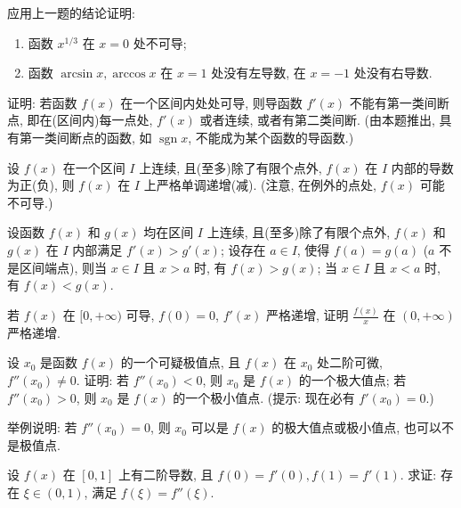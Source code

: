 \begin{exercise}[3.3.14]
    应用上一题的结论证明:
    \begin{enumerate}
        \item 函数 $x^{1/3}$ 在 $x=0$ 处不可导;
        \item 函数 $\arcsin x, \arccos x$ 在 $x=1$ 处没有左导数, 在 $x=-1$ 处没有右导数.
    \end{enumerate}
\end{exercise}

\begin{exercise}[3.3.15]
    证明: 若函数 $f(x)$ 在一个区间内处处可导, 则导函数 $f'(x)$ 不能有第一类间断点, 即在(区间内)每一点处, $f'(x)$ 或者连续, 或者有第二类间断. (由本题推出, 具有第一类间断点的函数, 如 $\operatorname{sgn} x$, 不能成为某个函数的导函数.)
\end{exercise}

\begin{exercise}[3.3.16]
    设 $f(x)$ 在一个区间 $I$ 上连续, 且(至多)除了有限个点外, $f(x)$ 在 $I$ 内部的导数为正(负), 则 $f(x)$ 在 $I$ 上严格单调递增(减). (注意, 在例外的点处, $f(x)$ 可能不可导.)
\end{exercise}

\begin{exercise}[3.3.17]
    设函数 $f(x)$ 和 $g(x)$ 均在区间 $I$ 上连续, 且(至多)除了有限个点外, $f(x)$ 和 $g(x)$ 在 $I$ 内部满足 $f'(x) > g'(x)$; 设存在 $a \in I$, 使得 $f(a)=g(a)$ ($a$ 不是区间端点), 则当 $x \in I$ 且 $x>a$ 时, 有 $f(x)>g(x)$; 当 $x \in I$ 且 $x<a$ 时, 有 $f(x)<g(x)$.
\end{exercise}

\begin{exercise}[3.3.18]
    若 $f(x)$ 在 $[0, +\infty)$ 可导, $f(0)=0$, $f'(x)$ 严格递增, 证明 $\frac{f(x)}{x}$ 在 $(0, +\infty)$ 严格递增.
\end{exercise}

\begin{exercise}[3.3.19]
    设 $x_0$ 是函数 $f(x)$ 的一个可疑极值点, 且 $f(x)$ 在 $x_0$ 处二阶可微, $f''(x_0) \ne 0$. 证明: 若 $f''(x_0)<0$, 则 $x_0$ 是 $f(x)$ 的一个极大值点; 若 $f''(x_0)>0$, 则 $x_0$ 是 $f(x)$ 的一个极小值点. (提示: 现在必有 $f'(x_0)=0$.)

    举例说明: 若 $f''(x_0)=0$, 则 $x_0$ 可以是 $f(x)$ 的极大值点或极小值点, 也可以不是极值点.
\end{exercise}

\begin{exercise}[3.3.20]
    设 $f(x)$ 在 $[0,1]$ 上有二阶导数, 且 $f(0)=f'(0), f(1)=f'(1)$. 求证: 存在 $\xi \in (0,1)$, 满足 $f(\xi)=f''(\xi)$.
\end{exercise}

